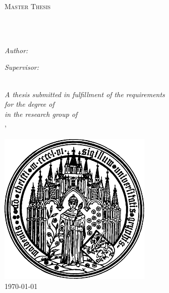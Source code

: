 \documentclass[
	10pt,
	twoside,
	chapterinoneline,
	onehalfspacing, %
	nolistspacing, %
	parskip, %
	headsepline, %
	english,
]{MastersDoctoralThesis} %
\begin{document}
\begin{titlepage}
	\begin{center}
		{\scshape\LARGE \univname\par}\vspace{1.5cm} %
		\textsc{\Large Master Thesis}\\[0.5cm]
		\HRule\\[0.4cm] %
		{\huge \bfseries \ttitle\par}\vspace{0.4cm} %
		\HRule\\[1.5cm] %
		\begin{minipage}[htbp]{0.4\textwidth}
			\begin{flushleft}\large
				\emph{Author:}\\
				\authorname%
			\end{flushleft}
		\end{minipage}
		\hfill
		\begin{minipage}[htbp]{0.4\textwidth}
			\begin{flushright}\large
				\emph{Supervisor:}\\
				\supname%
			\end{flushright}
		\end{minipage}\\[0.5cm]
		\large \textit{A thesis submitted in fulfillment of
									 the requirements\\ for the degree of
									 \degreename}\\[0.3cm]
		\textit{in the research group of}\\[0.4cm]
		\groupname,\\\deptname\\[1cm]
    \includegraphics[width=0.55\textwidth]{figures/logo}\\[1cm]
		{\large \today} %
		\vfill
	\end{center}
\end{titlepage}
\end{document}
